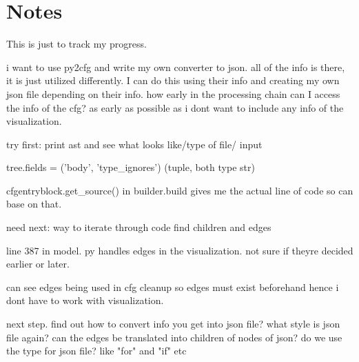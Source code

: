 \chapter{Notes}

This is just to track my progress.


i want to use py2cfg and write my own converter to json. all of the info is there, it is just utilized differently. I can do this using their info and creating my own json file depending on their info.
how early in the processing chain can I access the info of the cfg? as early as possible as i dont want to include any info of the visualization.

try first: print ast and see what looks like/type of file/ input


tree.fields =  ('body', 'type\_ignores') (tuple, both type str)

cfgentryblock.get\_source() in builder.build gives me the actual line of code so can base on that.

need next: \newline
way to iterate through code  \newline
find children and edges

line 387 in model. py handles edges in the visualization. not sure if theyre decided earlier or later.

can see edges being used in cfg cleanup so edges must exist beforehand hence i dont have to work with visualization. 
 
next step. find out how to convert info you get into json file? what style is json file again?
can the edges be translated into children of nodes of json?
do we use the type for json file? like "for" and "if" etc


